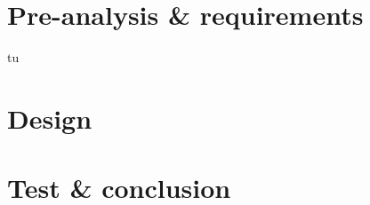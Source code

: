 \part{Pre-analysis \& requirements}\label{pt:preanalysis_req} \glsresetall
%

%
\graphicspath{{figures/technical/}}
\gls{tu}
%
\part{Design}\label{pt:design} \glsresetall
%

\part{Test \& conclusion}\label{pt:test_conclusion} \glsresetall
